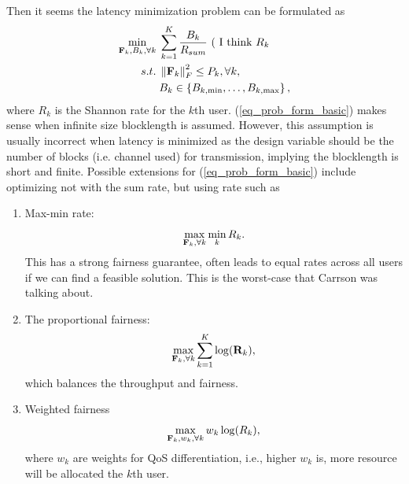 \documentclass[a4paper, 12pt, onecolumn, journal, twoside, draftclsnofoot]{IEEEtran}
\begin{document}
Then it seems the latency minimization problem can be formulated as
\begin{equation}
	\begin{split}
		\min_{{\bf F}_k, B_k, \forall k}  &\;  \sum_{k=1}^K  \frac{ B_k } { R_{sum}  }   \text{ ( I think } R_k  \\
		s.t. &\;  \left\| {\bf F}_k \right\|_F^2  \leq P_k,  \forall k, \\
		&\; B_k \in \left\{  B_{k,\min}, \ldots, B_{k,\max} \right\},
	\end{split}
\label{eq_prob_form_basic}
\end{equation}
where $R_k$ is the Shannon rate for the $k$th user.  (\ref{eq_prob_form_basic}) makes sense when  infinite size blocklength is assumed.  However, this assumption is usually incorrect when latency is minimized as the design variable should be the number of blocks (i.e. channel used) for transmission, implying the blocklength is short and finite.  Possible extensions for (\ref{eq_prob_form_basic}) include optimizing not with the sum rate, but using rate such as
\begin{enumerate}[1.]
	\item Max-min rate: 
	\begin{equation*}
		\max_{{\bf F}_k, \forall k}  \min_k  R_k.
	\end{equation*}
This has a strong fairness guarantee, often leads to equal rates across all users if we can find a feasible solution.  This is the worst-case that Carrson was talking about.
	\item The proportional fairness:
	\begin{equation*}
		\max_{{\bf F}_k, \forall k}   \sum_{k=1}^K  \log ({\bf R}_k), 
	\end{equation*}
which balances the throughput and fairness. 
	\item Weighted fairness 
	\begin{equation*}
		\max_{{\bf F}_k, w_k, \forall k}  w_k \log (R_k), 
	\end{equation*}
where $w_k$ are weights for QoS differentiation, i.e., higher $w_k$ is, more resource will be allocated the $k$th user.
\end{enumerate}
\end{document}
